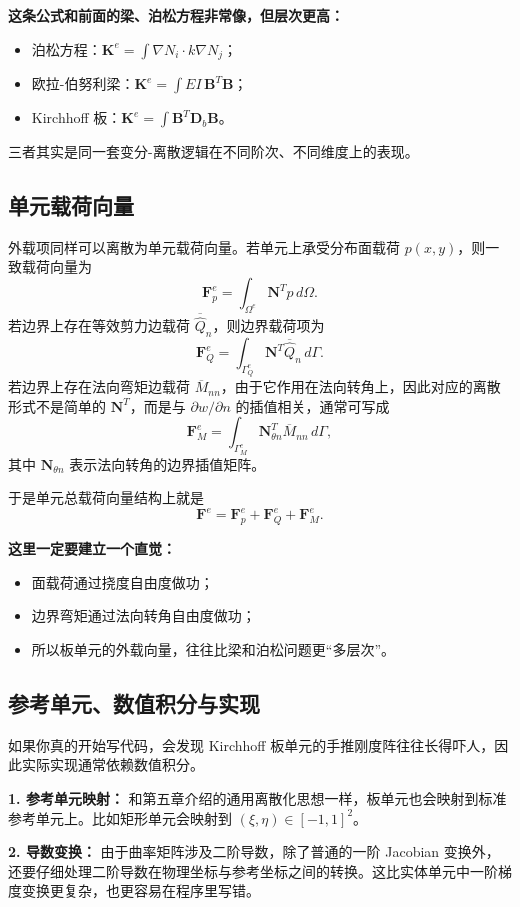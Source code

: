 \documentclass[11pt, a4paper, UTF8]{ctexart}
\begin{document}
\textbf{这条公式和前面的梁、泊松方程非常像，但层次更高：}
\begin{itemize}
    \item 泊松方程：$\bm{K}^e = \int \nabla N_i \cdot k \nabla N_j$；
    \item 欧拉-伯努利梁：$\bm{K}^e = \int EI\, \bm{B}^T\bm{B}$；
    \item Kirchhoff 板：$\bm{K}^e = \int \bm{B}^T \bm{D}_b \bm{B}$。
\end{itemize}
三者其实是同一套变分-离散逻辑在不同阶次、不同维度上的表现。

\subsection{单元载荷向量}
外载项同样可以离散为单元载荷向量。若单元上承受分布面载荷 $p(x,y)$，则一致载荷向量为
\[
\bm{F}^e_p
=
\int_{\Omega^e}
\bm{N}^T p
\,
d\Omega.
\]
若边界上存在等效剪力边载荷 $\overline{\widehat{Q}}_n$，则边界载荷项为
\[
\bm{F}^e_Q
=
\int_{\Gamma_Q^e}
\bm{N}^T \overline{\widehat{Q}}_n
\,
d\Gamma.
\]
若边界上存在法向弯矩边载荷 $\overline{M}_{nn}$，由于它作用在法向转角上，因此对应的离散形式不是简单的 $\bm{N}^T$，而是与 $\partial w/\partial n$ 的插值相关，通常可写成
\[
\bm{F}^e_M
=
\int_{\Gamma_M^e}
\bm{N}_{\theta n}^T \overline{M}_{nn}
\,
d\Gamma,
\]
其中 $\bm{N}_{\theta n}$ 表示法向转角的边界插值矩阵。

于是单元总载荷向量结构上就是
\[
\bm{F}^e = \bm{F}^e_p + \bm{F}^e_Q + \bm{F}^e_M.
\]

\textbf{这里一定要建立一个直觉：}
\begin{itemize}
    \item 面载荷通过挠度自由度做功；
    \item 边界弯矩通过法向转角自由度做功；
    \item 所以板单元的外载向量，往往比梁和泊松问题更“多层次”。
\end{itemize}

\subsection{参考单元、数值积分与实现}
如果你真的开始写代码，会发现 Kirchhoff 板单元的手推刚度阵往往长得吓人，因此实际实现通常依赖数值积分。

\textbf{1. 参考单元映射：}
和第五章介绍的通用离散化思想一样，板单元也会映射到标准参考单元上。比如矩形单元会映射到 $(\xi,\eta)\in[-1,1]^2$。

\textbf{2. 导数变换：}
由于曲率矩阵涉及二阶导数，除了普通的一阶 Jacobian 变换外，还要仔细处理二阶导数在物理坐标与参考坐标之间的转换。这比实体单元中一阶梯度变换更复杂，也更容易在程序里写错。
\end{document}
